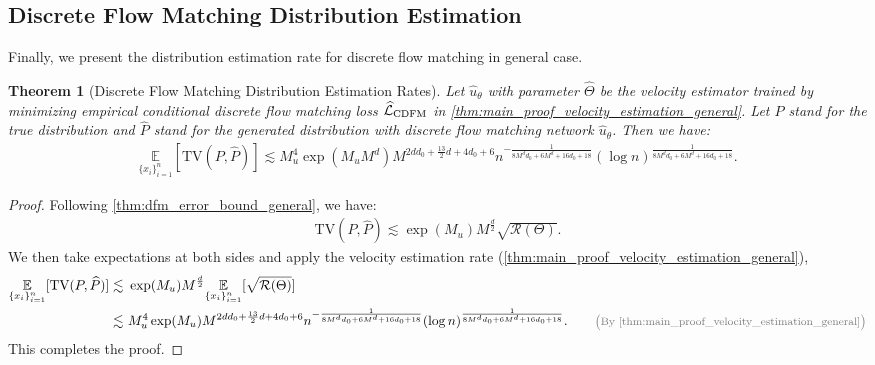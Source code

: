 \documentclass[12pt]{article}
\numberwithin{equation}{section}
\let\hat\widehat
\newcommand{\wh}{\widehat}
\renewcommand{\hat}{\wh}
\DeclareMathOperator*{\E}{{\mathbb{E}}}
\def\E{\mathbb{E}}
\theoremstyle{theoremstyle}
\newtheorem{theorem}{Theorem}[section]
\numberwithin{equation}{section}
\numberwithin{theorem}{section}
\numberwithin{proposition}{section}
\numberwithin{definition}{section}
\numberwithin{lemma}{section}
\numberwithin{assumption}{section}
\numberwithin{remark}{section}
\newcommand*{\annot}[1]{\tag*{\footnotesize{\textcolor{black!50}{\big(#1\big)}}}}
\begin{document}
\subsection{Discrete Flow Matching Distribution Estimation}
\label{sec:distri_esti_general}
Finally, we present the distribution estimation rate for discrete flow matching in general case.

\begin{theorem}[Discrete Flow Matching Distribution Estimation Rates]
\label{thm:main_proof_distribution_estimation_general}
Let $\hat{u}_\theta$ with parameter $\hat{\Theta}$ be the velocity estimator trained by minimizing empirical conditional discrete flow matching loss $\hat{\mathcal{L}}_{\rm CDFM}$ in \cref{thm:main_proof_velocity_estimation_general}.
Let $P$ stand for the true distribution and $\hat{P}$ stand for the generated distribution with discrete flow matching network $\hat{u}_\theta$.
Then we have:
\begin{align*}
    \underset{\{x_i\}_{i=1}^n}{\E}[\text{TV}(P,\hat{P})]\lesssim M_u^4\exp(M_uM^d)M^{2dd_0+\frac{13}{2}d+4d_0+6}n^{-\frac{ 1}{8M^dd_0+6M^d+16d_0+18}}(\log n)^{\frac{1}{8M^dd_0+6M^d+16d_0+18}}.
\end{align*}
\end{theorem}

\begin{proof}




Following \cref{thm:dfm_error_bound_general}, we have:
\begin{align*}
    \text{TV}(P,\hat{P})
    \lesssim 
    \exp(M_u)M^{\frac{d}{2}}\sqrt{\mathcal{R}(\Theta)}.
\end{align*}
We then take expectations at both sides and apply the velocity estimation rate (\cref{thm:main_proof_velocity_estimation_general}), 
\begin{align*}
    \underset{\{x_i\}_{i=1}^n}{\E}[\text{TV}(P,\hat{P})]\lesssim & ~
    \exp(M_u)M^{\frac{d}{2}}\underset{\{x_i\}_{i=1}^n}{\E}[\sqrt{\mathcal{R}(\Theta)}] \\
    \lesssim & ~
    M_u^4\exp(M_u)M^{2dd_0+\frac{13}{2}d+4d_0+6}n^{-\frac{ 1}{8M^dd_0+6M^d+16d_0+18}}(\log n)^{\frac{1}{8M^dd_0+6M^d+16d_0+18}}. \annot{By \cref{thm:main_proof_velocity_estimation_general}}
\end{align*}
This completes the proof.
\end{proof}


\clearpage











\clearpage
\def\arxivfont{\rm}





\end{document}
